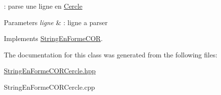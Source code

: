\+: parse une ligne en \mbox{\hyperlink{class_cercle}{Cercle}} 


\begin{DoxyParams}{Parameters}
{\em ligne} & \+: ligne a parser \\
\hline
\end{DoxyParams}


Implements \mbox{\hyperlink{class_string_en_forme_c_o_r}{String\+En\+Forme\+C\+OR}}.



The documentation for this class was generated from the following files\+:\begin{DoxyCompactItemize}
\item 
\mbox{\hyperlink{_string_en_forme_c_o_r_cercle_8hpp}{String\+En\+Forme\+C\+O\+R\+Cercle.\+hpp}}\item 
String\+En\+Forme\+C\+O\+R\+Cercle.\+cpp\end{DoxyCompactItemize}
